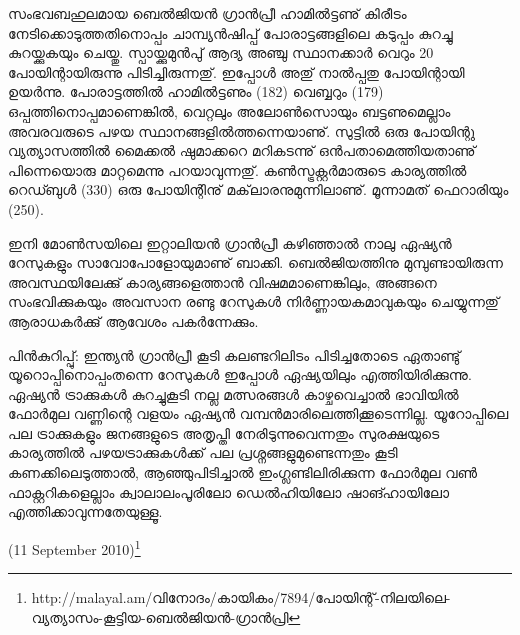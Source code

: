 സംഭവബഹുലമായ ബെല്‍ജിയന്‍ ഗ്രാന്‍പ്രീ ഹാമില്‍ട്ടണു് കിരീടം നേടിക്കൊടുത്തതിനൊപ്പം ചാമ്പ്യന്‍ഷിപ്പ് 
പോരാട്ടങ്ങളിലെ കടുപ്പം കുറച്ചു കുറയ്ക്കുകയും ചെയ്തു. സ്പായ്ക്കുമുന്‍പു് ആദ്യ അഞ്ചു സ്ഥാനക്കാര്‍ വെറും 20 പോയിന്റായിരുന്നു 
പിടിച്ചിരുന്നതു്. ഇപ്പോള്‍ അതു് നാല്‍പ്പതു പോയിന്റായി ഉയര്‍ന്നു. പോരാട്ടത്തില്‍ ഹാമില്‍ട്ടണും (182) വെബ്ബറും (179) 
ഒപ്പത്തിനൊപ്പമാണെങ്കില്‍, വെറ്റലും അലോണ്‍സൊയും ബട്ടണുമെല്ലാം അവരവരുടെ പഴയ സ്ഥാനങ്ങളില്‍ത്തന്നെയാണു്.
സുട്ടില്‍ ഒരു പോയിന്റു വ്യത്യാസത്തില്‍ മൈക്കല്‍ ഷുമാക്കറെ മറികടന്നു് ഒന്‍പതാമെത്തിയതാണു് പിന്നെയൊരു 
മാറ്റമെന്നു പറയാവുന്നതു്. കണ്‍സ്ട്രക്റ്റര്‍മാരുടെ കാര്യത്തില്‍ റെഡ്ബുള്‍ (330) ഒരു പോയിന്റിനു് മക്‌ലാരനുമുന്നിലാണു്. 
മൂന്നാമത് ഫെറാരിയും (250).

ഇനി മോണ്‍സയിലെ ഇറ്റാലിയന്‍ ഗ്രാന്‍പ്രീ കഴിഞ്ഞാല്‍ നാലു ഏഷ്യന്‍ റേസുകളും സാവോപോളോയുമാണു് ബാക്കി. 
ബെല്‍ജിയത്തിനു മുമ്പുണ്ടായിരുന്ന അവസ്ഥയിലേക്കു് കാര്യങ്ങളെത്താന്‍ വിഷമമാണെങ്കിലും, അങ്ങനെ 
സംഭവിക്കുകയും അവസാന രണ്ടു റേസുകള്‍ നിര്‍ണ്ണായകമാവുകയും ചെയ്യുന്നതു് ആരാധകര്‍ക്കു് ആവേശം 
പകര്‍ന്നേക്കും.

പിന്‍കുറിപ്പു്: ഇന്ത്യന്‍ ഗ്രാന്‍പ്രീ കൂടി കലണ്ടറിലിടം പിടിച്ചതോടെ ഏതാണ്ടു് യൂറൊപ്പിനൊപ്പംതന്നെ റേസുകള്‍ ഇപ്പോള്‍ 
ഏഷ്യയിലും എത്തിയിരിക്കുന്നു. ഏഷ്യന്‍ ട്രാക്കുകള്‍ കുറച്ചുകൂടി നല്ല മത്സരങ്ങള്‍ കാഴ്ചവെച്ചാല്‍ ഭാവിയില്‍ ഫോര്‍മുല 
വണ്ണിന്റെ വളയം ഏഷ്യന്‍ വമ്പന്‍മാരിലെത്തിക്കൂടെന്നില്ല. യൂറോപ്പിലെ പല ട്രാക്കുകളും ജനങ്ങളുടെ അതൃപ്തി 
നേരിടുന്നുവെന്നതും സുരക്ഷയുടെ കാര്യത്തില്‍ പഴയട്രാക്കുകള്‍ക്ക് പല പ്രശ്നങ്ങളുമുണ്ടെന്നതും കൂടി കണക്കിലെടുത്താല്‍,
ആഞ്ഞുപിടിച്ചാല്‍ ഇംഗ്ലണ്ടിലിരിക്കുന്ന ഫോര്‍മുല വണ്‍ ഫാക്റ്ററികളെല്ലാം ക്വാലാലംപൂരിലോ ഡെല്‍ഹിയിലോ 
ഷാങ്ഹായിലോ എത്തിക്കാവുന്നതേയുള്ളൂ.

(11 September 2010)\footnote{http://malayal.am/വിനോദം/കായികം/7894/പോയിന്റ്-നിലയിലെ-വ്യത്യാസം-കൂട്ടിയ-ബെല്‍ജിയന്‍-ഗ്രാന്‍പ്രി}

\newpage
